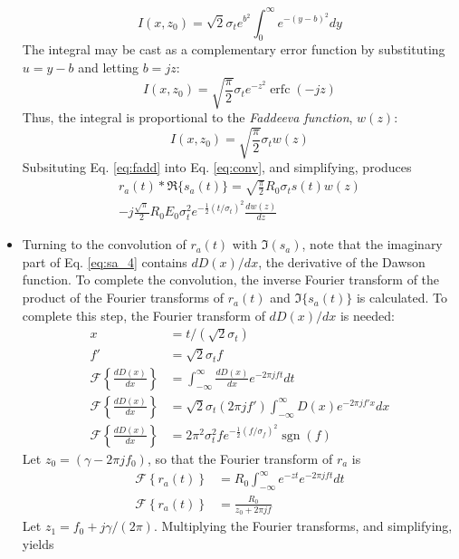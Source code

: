 \documentclass[amsmath,amssymb,aps,prd,10pt,twocolumn,showkeys]{revtex4}
\DeclareMathOperator\erfc{erfc}
\DeclareMathOperator{\sgn}{sgn}
\begin{document}
\begin{itemize}
\begin{equation}
I(x,z_0) = \sqrt{2}\sigma_t e^{b^2} \int_0^{\infty} e^{-(y-b)^2} dy
\end{equation}
The integral may be cast as a complementary error function by substituting $u=y-b$ and letting $b=jz$:
\begin{equation}
I(x,z_0) = \sqrt{\frac{\pi}{2}}\sigma_t e^{-z^2}\erfc(-jz)
\end{equation}
Thus, the integral is proportional to the \textit{Faddeeva function}, $w(z)$:
\begin{equation}
I(x,z_0) = \sqrt{\frac{\pi}{2}} \sigma_t w(z) \label{eq:fadd}
\end{equation}
Subsituting Eq. \ref{eq:fadd} into Eq. \ref{eq:conv}, and simplifying, produces
\begin{multline}
r_a(t) * \Re\lbrace s_a(t) \rbrace = \sqrt{\frac{\pi}{2}}R_0 \sigma_t s(t) w(z) \\
-j\frac{\sqrt{\pi}}{2} R_0 E_0 \sigma_t^2 e^{-\frac{1}{2}(t/\sigma_t)^2} \frac{dw(z)}{dz}
\end{multline}
\item Turning to the convolution of $r_a(t)$ with $\Im(s_a)$, note that the imaginary part of Eq. \ref{eq:sa_4} contains $dD(x)/dx$, the derivative of the Dawson function.  To complete the convolution, the inverse Fourier transform of the product of the Fourier transforms of $r_a(t)$ and $\Im\lbrace s_a(t)\rbrace$ is calculated.  To complete this step, the Fourier transform of $dD(x)/dx$ is needed:
\begin{align}
x &= t/(\sqrt{2}\sigma_t) \\
f' &= \sqrt{2} \sigma_t f \\
\mathcal{F}\left\lbrace \frac{dD(x)}{dx}\right\rbrace &= \int_{-\infty}^{\infty} \frac{dD(x)}{dx}e^{-2\pi jft} dt \\
\mathcal{F}\left\lbrace \frac{dD(x)}{dx}\right\rbrace &= \sqrt{2}\sigma_t(2\pi jf') \int_{-\infty}^{\infty} D(x) e^{-2\pi jf'x} dx \\
\mathcal{F}\left\lbrace \frac{dD(x)}{dx}\right\rbrace &= 2\pi^2 \sigma_t^2 f e^{-\frac{1}{2}(f/\sigma_f)^2} \sgn(f)
\end{align}
Let $z_0 = (\gamma - 2\pi jf_0)$, so that the Fourier transform of $r_a$ is 
\begin{align}
\mathcal{F}\left\lbrace r_a(t)\right\rbrace &= R_0\int_{-\infty}^{\infty} e^{-zt} e^{-2\pi j ft} dt \\
\mathcal{F}\left\lbrace r_a(t)\right\rbrace &= \frac{R_0}{z_0+2\pi j f}
\end{align}
Let $z_1 = f_0 + j\gamma/(2\pi)$. Multiplying the Fourier transforms, and simplifying, yields

\end{itemize}
\end{document}
